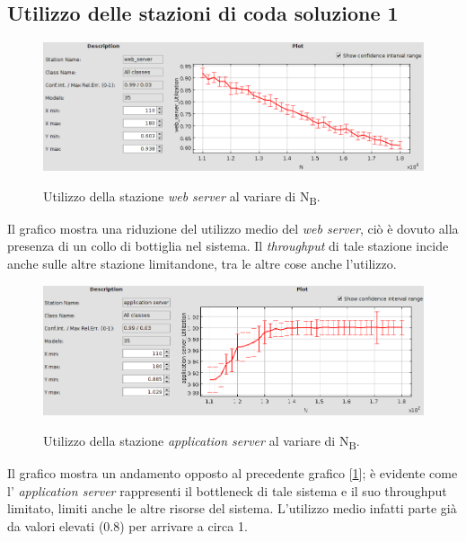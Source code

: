 \documentclass[../main.tex]{subfiles}
\begin{document}
    \subsection{Utilizzo delle stazioni di coda soluzione 1}\label{subsec:utilizzo-delle-stazioni-di-coda}
    \begin{figure}[H]
        \centering
        \includegraphics[scale = 0.45]{assets/ws_ut_1.png}\\
        \caption[\textit{Utilizzo} della stazione \textit{web server}]{Utilizzo della stazione \textit{web server} al
        variare di N\textsubscript{B}.}
        \label{fig:utilizzo-ws}
    \end{figure}
    Il grafico mostra una riduzione del utilizzo medio del \textit{web server}, ciò è dovuto alla presenza di un collo
    di bottiglia nel sistema. Il \textit{throughput} di tale stazione incide anche sulle altre stazione limitandone, tra
    le altre cose anche l'utilizzo.

    \begin{figure}[H]
        \centering
        \includegraphics[scale = 0.45]{assets/as_ut_1.png}\\
        \caption[\textit{Utilizzo} della stazione \textit{application server}]{Utilizzo della stazione\textit{
            application server} al variare di N\textsubscript{B}.}
        \label{fig:utilizzo-as}
    \end{figure}
    Il grafico mostra un andamento opposto al precedente grafico [\ref{fig:utilizzo-ws}]; è evidente come l'
    \textit{application server} rappresenti il bottleneck di tale sistema e il suo throughput limitato, limiti anche le
    altre risorse del sistema. L'utilizzo medio infatti parte già da valori elevati (0.8) per arrivare a circa 1.
\end{document}

